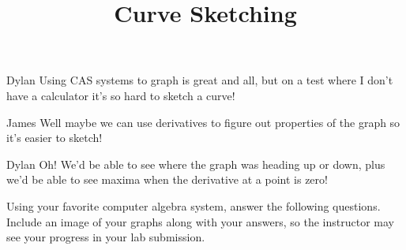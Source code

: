 \documentclass{ximera}
\title{Curve Sketching}
\begin{document}
\maketitle
\begin{dialogue}
\item[Dylan] Using CAS systems to graph is great and all, but on a test where I don't have a calculator it's so hard to sketch a curve!
\item[James] Well maybe we can use derivatives to figure out properties of the graph so it's easier to sketch!
\item[Dylan] Oh! We'd be able to see where the graph was heading up or down, plus we'd be able to see maxima when the derivative at a point is zero!
\end{dialogue}

Using your favorite computer algebra system, answer the following questions. Include an image of your graphs along with your answers, so the instructor may see your progress in your lab submission. 
\end{document}
